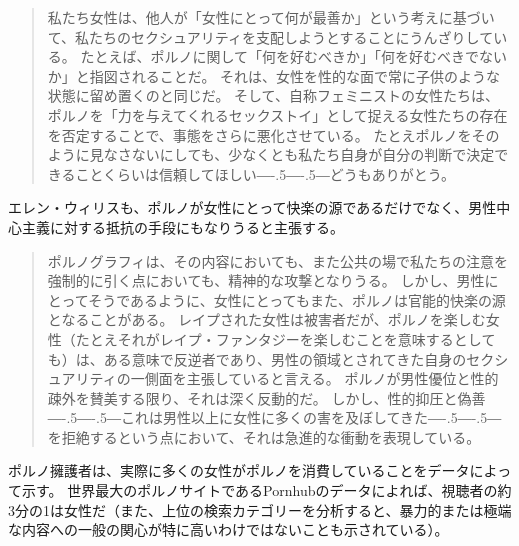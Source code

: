\documentclass[paper=a4,book,openany]{jlreq}
\def\DDASH{―\kern-.5\zw―\kern-.5\zw―}
\begin{document}
\begin{quote}
私たち女性は、他人が「女性にとって何が最善か」という考えに基づいて、私たちのセクシュアリティを支配しようとすることにうんざりしている。
たとえば、ポルノに関して「何を好むべきか」「何を好むべきでないか」と指図されることだ。
それは、女性を性的な面で常に子供のような状態に留め置くのと同じだ。
そして、自称フェミニストの女性たちは、ポルノを「力を与えてくれるセックストイ」として捉える女性たちの存在を否定することで、事態をさらに悪化させている。
たとえポルノをそのように見なさないにしても、少なくとも私たち自身が自分の判断で決定できることくらいは信頼してほしい{\DDASH}どうもありがとう。
\citep{clark-flory10}
\end{quote}

エレン・ウィリスも、ポルノが女性にとって快楽の源であるだけでなく、男性中心主義に対する抵抗の手段にもなりうると主張する。

\begin{quote}
ポルノグラフィは、その内容においても、また公共の場で私たちの注意を強制的に引く点においても、精神的な攻撃となりうる。
しかし、男性にとってそうであるように、女性にとってもまた、ポルノは官能的快楽の源となることがある。
レイプされた女性は被害者だが、ポルノを楽しむ女性（たとえそれがレイプ・ファンタジーを楽しむことを意味するとしても）は、ある意味で反逆者であり、男性の領域とされてきた自身のセクシュアリティの一側面を主張していると言える。
ポルノが男性優位と性的疎外を賛美する限り、それは深く反動的だ。
しかし、性的抑圧と偽善{\DDASH}これは男性以上に女性に多くの害を及ぼしてきた{\DDASH}を拒絶するという点において、それは急進的な衝動を表現している。
\citep[pp.83-84]{willis84:_femin_moral_pornog}
\end{quote}

ポルノ擁護者は、実際に多くの女性がポルノを消費していることをデータによって示す。
世界最大のポルノサイトであるPornhubのデータによれば、視聴者の約3分の1は女性だ（また、上位の検索カテゴリーを分析すると、暴力的または極端な内容への一般の関心が特に高いわけではないことも示されている）\citep{insights19:_year_review}。
\end{document}
